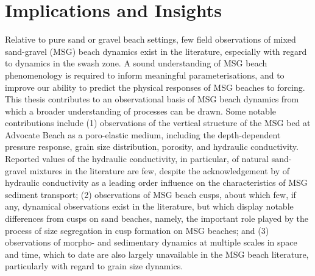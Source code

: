 \section{Implications and Insights}\label{section:Insights}



Relative to pure sand or gravel beach settings, few field observations of mixed sand-gravel (MSG) beach dynamics exist in the literature, especially with regard to dynamics in the swash zone. A sound understanding of MSG beach phenomenology is required to inform meaningful parameterisations, and to improve our ability to predict the physical responses of MSG beaches to forcing. This thesis contributes to an observational basis of MSG beach dynamics from which a broader understanding of processes can be drawn. Some notable contributions include (1) observations of the vertical structure of the MSG bed at Advocate Beach as a poro-elastic medium, including the depth-dependent pressure response, grain size distribution, porosity, and hydraulic conductivity. Reported values of the hydraulic conductivity, in particular, of natural sand-gravel mixtures in the literature are few, despite the acknowledgement by \citet{Mason_Coates2001} of hydraulic conductivity as a leading order influence on the characteristics of MSG sediment transport; (2) observations of MSG beach cusps, about which few, if any, dynamical observations exist in the literature, but which display notable differences from cusps on sand beaches, namely, the important role played by the process of size segregation in cusp formation on MSG beaches; and (3) observations of morpho- and sedimentary dynamics at multiple scales in space and time, which to date are also largely unavailable in the MSG beach literature, particularly with regard to grain size dynamics. 


